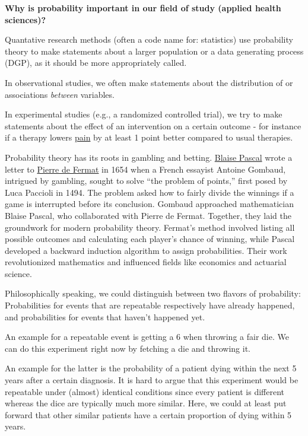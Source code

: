 \documentclass[
]{book}
\begin{document}
\textbf{Why is probability important in our field of study (applied health sciences)?}

Quantative research methods (often a code name for: statistics) use probability theory to make statements about a larger
population or a data generating process (DGP), as it should be more appropriately called.

In observational studies, we often make statements about the distribution of or
associations \emph{between} variables.

In experimental studies (e.g., a randomized controlled trial), we try to make statements about the effect of an intervention on a
certain outcome - for instance if a therapy lowers \href{https://jamanetwork.com/journals/jama/fullarticle/2794765}{pain} by at least 1 point better compared to usual therapies.

Probability theory has its roots in gambling and betting. \href{https://en.wikipedia.org/wiki/Blaise_Pascal}{Blaise Pascal} wrote a letter to \href{https://en.wikipedia.org/wiki/Pierre_de_Fermat}{Pierre de Fermat} in 1654 when a
French essayist Antoine Gombaud, intrigued by gambling, sought to solve ``the problem of points,''
first posed by Luca Paccioli in 1494. The problem asked how to fairly divide the winnings if a game is interrupted before
its conclusion. Gombaud approached mathematician Blaise Pascal, who collaborated with Pierre de Fermat. Together, they laid
the groundwork for modern probability theory. Fermat's method involved listing all possible outcomes and calculating each player's
chance of winning, while Pascal developed a backward induction algorithm to assign probabilities. Their work revolutionized mathematics
and influenced fields like economics and actuarial science.

Philosophically speaking, we could distinguish between two flavors of probability: Probabilities for events that are repeatable respectively have already happened, and probabilities for events that haven't happened yet.

An example for a repeatable event is getting a 6 when throwing a fair die. We can do this experiment right now by fetching a die and throwing it.

An example for the latter is the probability of a patient dying within the next 5 years after a certain diagnosis.
It is hard to argue that this experiment would be repeatable under (almost) identical conditions since every patient is different whereas the dice are typically much more similar.
Here, we could at least put forward that other similar patients have a certain proportion of dying within 5 years.
\end{document}
